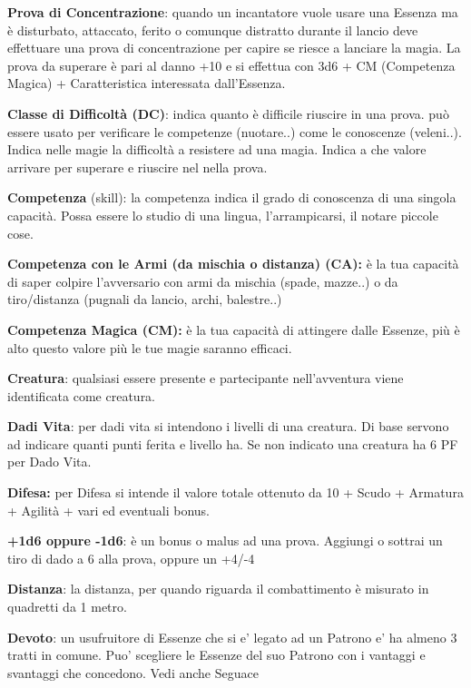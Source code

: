 \documentclass[a4paper,11pt,twoside,openany]{book}
\begin{document}
\textbf{Prova di Concentrazione}: quando un incantatore vuole usare una Essenza ma è disturbato, attaccato, ferito o comunque distratto durante il lancio deve effettuare una prova di concentrazione per capire se riesce a lanciare la magia. La prova da superare è pari al danno +10 e si effettua con 3d6 + CM (Competenza Magica) + Caratteristica interessata dall'Essenza.

\textbf{Classe di Difficoltà (DC)}: indica quanto è difficile riuscire in una prova. può essere usato per verificare le competenze (nuotare..) come le conoscenze (veleni..). Indica nelle magie la difficoltà a resistere ad una magia. Indica a che valore arrivare per superare e riuscire nel nella prova.

\textbf{Competenza} (skill): la competenza indica il grado di conoscenza di una singola capacità. Possa essere lo studio di una lingua, l'arrampicarsi, il notare piccole cose.

\textbf{Competenza con le Armi (da mischia o distanza) (CA):} è la tua capacità di saper colpire l'avversario con armi da mischia (spade, mazze..) o da tiro/distanza (pugnali da lancio, archi, balestre..) 

\textbf{Competenza Magica (CM):} è la tua capacità di attingere dalle Essenze, più è alto questo valore più le tue magie saranno efficaci.

\textbf{Creatura}: qualsiasi essere presente e partecipante nell'avventura viene identificata come creatura.

\textbf{Dadi Vita}: per dadi vita si intendono i livelli di una creatura. Di base servono ad indicare quanti punti ferita e livello ha. Se non indicato una creatura ha 6 PF per Dado Vita.

\textbf{Difesa:} per Difesa si intende il valore totale ottenuto da 10 + Scudo + Armatura + Agilità + vari ed eventuali bonus.

\textbf{+1d6 oppure -1d6}: è un bonus o malus ad una prova. Aggiungi o sottrai un tiro di dado a 6 alla prova, oppure un +4/-4

\textbf{Distanza}: la distanza, per quando riguarda il combattimento è misurato in quadretti da 1 metro.

\textbf{Devoto}: un usufruitore di Essenze che si e’ legato ad un Patrono e’ ha almeno 3 tratti in comune.
Puo’ scegliere le Essenze del suo Patrono con i vantaggi e svantaggi che concedono. Vedi anche Seguace
\end{document}
